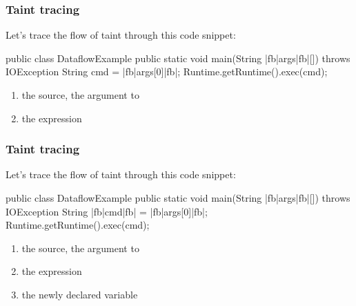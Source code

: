 \documentclass[aspectratio=169, handout]{beamer}
\begin{document}
\begin{frame}[fragile]
  \frametitle{Taint tracing}

  \begin{minipage}[t][1.6in][t]{\textwidth}
    Let's trace the flow of taint through this code snippet:

    \begin{pythoncodeblock}[language=java]
      public class DataflowExample {
        public static void main(String |fb|args|fb|[]) throws IOException {
          String cmd = |fb|args[0]|fb|;
          Runtime.getRuntime().exec(cmd);
        }
      }
    \end{pythoncodeblock}
  \end{minipage}
  \begin{minipage}[t][1in][t]{\textwidth}
    \begin{enumerate}
      \item the {\color{sourceColor}source}, the  argument to 
      \item the expression 
    \end{enumerate}
  \end{minipage}
\end{frame}

\begin{frame}[fragile]
  \frametitle{Taint tracing}

  \begin{minipage}[t][1.6in][t]{\textwidth}
    Let's trace the flow of taint through this code snippet:

    \begin{pythoncodeblock}[language=java]
      public class DataflowExample {
        public static void main(String |fb|args|fb|[]) throws IOException {
          String |fb|cmd|fb| = |fb|args[0]|fb|;
          Runtime.getRuntime().exec(cmd);
        }
      }
    \end{pythoncodeblock}
  \end{minipage}
  \begin{minipage}[t][1in][t]{\textwidth}
    \begin{enumerate}
      \item the {\color{sourceColor}source}, the  argument to 
      \item the expression 
      \item the newly declared variable 
    \end{enumerate}
  \end{minipage}
\end{frame}
\end{document}
